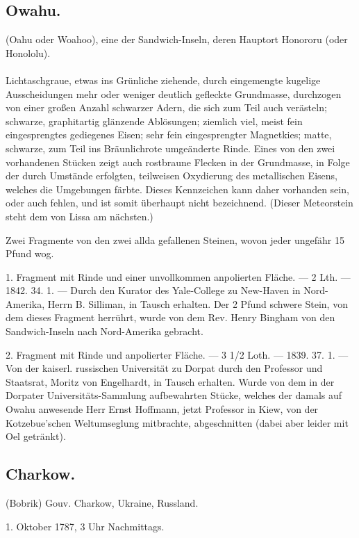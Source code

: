 \documentclass[a4paper, 11pt, oneside, polutonikogreek, german]{article}
\begin{document}
\subsection{Owahu.}
\begin{center}
\small
(Oahu oder Woahoo), eine der Sandwich-Inseln, deren Hauptort Honororu (oder Honololu).
\end{center}
\paragraph{}
Lichtaschgraue, etwas ins Grünliche ziehende, durch eingemengte kugelige Ausscheidungen mehr oder weniger deutlich gefleckte Grundmasse, durchzogen von einer großen Anzahl schwarzer Adern, die sich zum Teil auch verästeln; schwarze, graphitartig glänzende Ablösungen; ziemlich viel, meist fein eingesprengtes gediegenes Eisen; sehr fein eingesprengter Magnetkies; matte, schwarze, zum Teil ins Bräunlichrote umgeänderte Rinde. Eines von den zwei vorhandenen Stücken zeigt auch rostbraune Flecken in der Grundmasse, in Folge der durch Umstände erfolgten, teilweisen Oxydierung des metallischen Eisens, welches die Umgebungen färbte. Dieses Kennzeichen kann daher vorhanden sein, oder auch fehlen, und ist somit überhaupt nicht bezeichnend. (Dieser Meteorstein steht dem von Lissa am nächsten.)

Zwei Fragmente von den zwei allda gefallenen Steinen, wovon jeder ungefähr 15 Pfund wog.

1. Fragment mit Rinde und einer unvollkommen anpolierten Fläche. — 2 Lth. — 1842. 34. 1. — Durch den Kurator des Yale-College zu New-Haven in Nord-Amerika, Herrn B. Silliman, in Tausch erhalten. Der 2 Pfund schwere Stein, von dem dieses Fragment herrührt, wurde von dem Rev. Henry Bingham von den Sandwich-Inseln nach Nord-Amerika gebracht.

2. Fragment mit Rinde und anpolierter Fläche. — 3 1/2 Loth. — 1839. 37. 1. — Von der kaiserl. russischen Universität zu Dorpat durch den Professor und Staatsrat, Moritz von Engelhardt, in Tausch erhalten. Wurde von dem in der Dorpater Universitäts-Sammlung aufbewahrten Stücke, welches der damals auf Owahu anwesende Herr Ernst Hoffmann, jetzt Professor in Kiew, von der Kotzebue'schen Weltumseglung mitbrachte, abgeschnitten (dabei aber leider mit Oel getränkt).
\subsection{Charkow.}
\begin{center}
\small
(Bobrik) Gouv. Charkow, Ukraine, Russland.

1. Oktober 1787, 3 Uhr Nachmittags.
\end{center}
\end{document}
